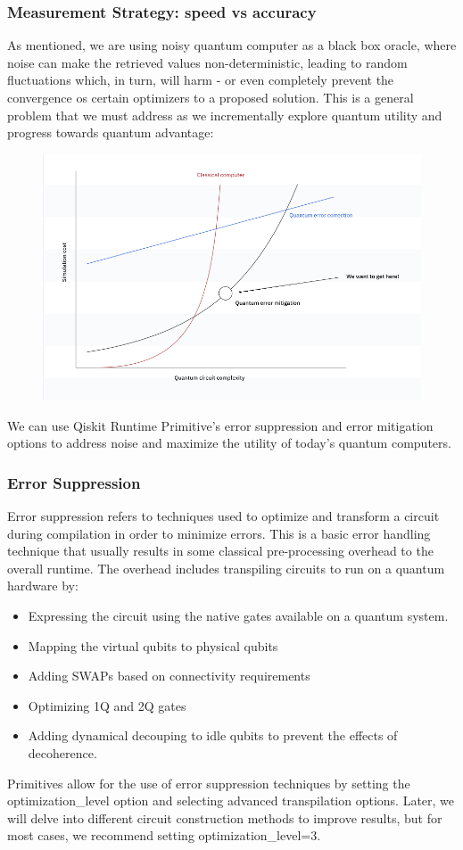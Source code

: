 \documentclass[12pt, oneside]{book}
\theoremstyle{definition}
\theoremstyle{definition}
\theoremstyle{remark}
\begin{document}
\subsubsection{Measurement Strategy: speed vs accuracy}
As mentioned, we are using noisy quantum computer as a black box oracle, where noise can make the retrieved values non-deterministic, leading to random fluctuations which, in turn, will harm - or even completely prevent the convergence os certain optimizers to a proposed solution. This is a general problem that we must address as we incrementally explore quantum utility and progress towards quantum advantage:
\begin{figure}[H]
    \centering
    \includegraphics[width=1\linewidth]{../images/measstrat_speedvsacc.png}
\end{figure}
We can use Qiskit Runtime Primitive's error suppression and error mitigation options to address noise and maximize the utility of today's quantum computers.

\subsubsection{Error Suppression}
Error suppression refers to techniques used to optimize and transform a circuit during compilation in order to minimize errors. This is a basic error handling technique that usually results in some classical pre-processing overhead to the overall runtime. The overhead includes transpiling circuits to run on a quantum hardware by:
\begin{itemize}
    \item Expressing the circuit using the native gates available on a quantum system.
    \item Mapping the virtual qubits to physical qubits
    \item Adding SWAPs based on connectivity requirements
    \item Optimizing 1Q and 2Q gates
    \item Adding dynamical decouping to idle qubits to prevent the effects of decoherence.
\end{itemize}
Primitives allow for the use of error suppression techniques by setting the optimization\_level option and selecting advanced transpilation options. Later, we will delve into different circuit construction methods to improve results, but for most cases, we recommend setting optimization\_level=3.
\end{document}
